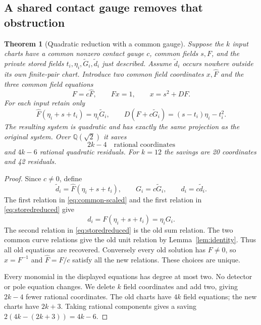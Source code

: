 \documentclass[11pt]{article}
\newtheorem{theorem}{Theorem}
\newcommand{\Q}{\mathbb Q}
\begin{document}
\subsection{A shared contact gauge removes that obstruction}

\begin{theorem}[Quadratic reduction with a common gauge]
\label{thm:stored}
Suppose the \(k\) input charts have a common nonzero contact
gauge \(c\), common fields \(s,F\), and the private stored
fields \(t_i,\eta_i,\widetilde G_i,\widetilde d_i\) just
described. Assume \(\widetilde d_i\) occurs nowhere outside
its own finite-pair chart.
Introduce two common field coordinates \(x,\widehat F\)
and the three common field equations
\begin{equation}\label{eq:common-scaled}
                  F=c\widehat F,\qquad
                  Fx=1,\qquad x=s^2+DF.
\end{equation}
For each input retain only
\begin{equation}\label{eq:storedreduced}
 \widehat F(\eta_i+s+t_i)=\eta_i\widetilde G_i,\qquad
 D(F+c\widetilde G_i)=(s-t_i)\eta_i-t_i^2 .
\end{equation}
The resulting system is quadratic and has exactly the
same projection as the original system. Over \(\Q(\sqrt2)\)
it saves
\[
                       2k-4\quad\text{rational coordinates}
\]
and \(4k-6\) rational quadratic residuals. For \(k=12\)
the savings are 20 coordinates and 42 residuals.
\end{theorem}
\begin{proof}
Since \(c\ne0\), define
\[
 \widetilde d_i=\widehat F(\eta_i+s+t_i),\qquad
 G_i=c\widetilde G_i,\qquad d_i=c\widetilde d_i .
\]
The first relation in \eqref{eq:common-scaled} and the
first relation in \eqref{eq:storedreduced} give
\[
          d_i=F(\eta_i+s+t_i)=\eta_iG_i.
\]
The second relation in \eqref{eq:storedreduced} is the
old sum relation. The two common curve relations give
the old unit relation by Lemma~\ref{lem:identity}.
Thus all old equations are recovered. Conversely every
old solution has \(F\ne0\), so
\(x=F^{-1}\) and \(\widehat F=F/c\) satisfy all the new
relations. These choices are unique.

Every monomial in the displayed equations has degree
at most two. No detector or pole equation changes.
We delete \(k\) field coordinates and add two, giving
\(2k-4\) fewer rational coordinates. The old charts
have \(4k\) field equations; the new charts have \(2k+3\).
Taking rational components gives a saving
\(2(4k-(2k+3))=4k-6\).
\end{proof}
\end{document}
